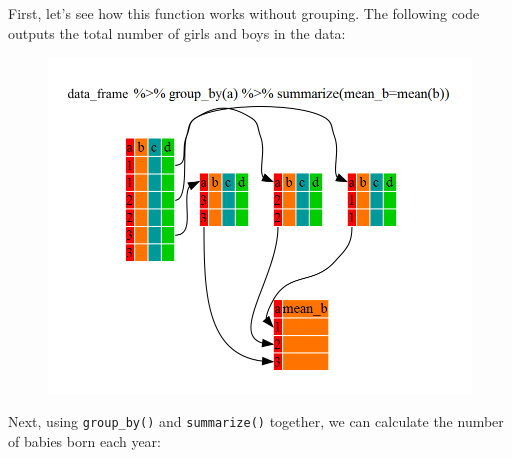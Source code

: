 \documentclass[]{book}
\newenvironment{Shaded}{\begin{snugshade}}{\end{snugshade}}
\newcommand{\KeywordTok}[1]{\textcolor[rgb]{0.13,0.29,0.53}{\textbf{#1}}}
\newcommand{\DataTypeTok}[1]{\textcolor[rgb]{0.13,0.29,0.53}{#1}}
\newcommand{\StringTok}[1]{\textcolor[rgb]{0.31,0.60,0.02}{#1}}
\newcommand{\OperatorTok}[1]{\textcolor[rgb]{0.81,0.36,0.00}{\textbf{#1}}}
\newcommand{\NormalTok}[1]{#1}
\begin{document}
First, let's see how this function works without grouping. The following
code outputs the total number of girls and boys in the data:

\begin{Shaded}
\end{Shaded}

\begin{figure}
\centering
\includegraphics{R/Rintro/images/split-apply-combine.png}
\caption{}
\end{figure}

Next, using \texttt{group\_by()} and \texttt{summarize()} together, we
can calculate the number of babies born each year:

\begin{Shaded}
\end{Shaded}
\end{document}
